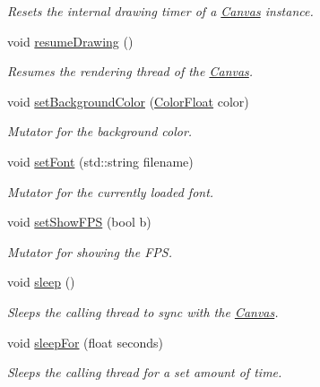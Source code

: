\begin{DoxyCompactItemize}
\begin{DoxyCompactList}\small\item\em Resets the internal drawing timer of a \hyperlink{classtsgl_1_1_canvas}{Canvas} instance. \end{DoxyCompactList}\item 
void \hyperlink{classtsgl_1_1_canvas_a56bf3c6e4eb7b06015d1c115aaa143f8}{resume\+Drawing} ()
\begin{DoxyCompactList}\small\item\em Resumes the rendering thread of the \hyperlink{classtsgl_1_1_canvas}{Canvas}. \end{DoxyCompactList}\item 
void \hyperlink{classtsgl_1_1_canvas_abb668fe42e2fe7f269b255152df959d8}{set\+Background\+Color} (\hyperlink{structtsgl_1_1_color_float}{Color\+Float} color)
\begin{DoxyCompactList}\small\item\em Mutator for the background color. \end{DoxyCompactList}\item 
void \hyperlink{classtsgl_1_1_canvas_a692edf8e37c7714cdf2a58ea530c63e9}{set\+Font} (std\+::string filename)
\begin{DoxyCompactList}\small\item\em Mutator for the currently loaded font. \end{DoxyCompactList}\item 
void \hyperlink{classtsgl_1_1_canvas_a8722c579dfa55a45e139bfeb269d73ff}{set\+Show\+F\+P\+S} (bool b)
\begin{DoxyCompactList}\small\item\em Mutator for showing the F\+P\+S. \end{DoxyCompactList}\item 
void \hyperlink{classtsgl_1_1_canvas_a2604fa056d4541f918ccf447eda1f3cf}{sleep} ()
\begin{DoxyCompactList}\small\item\em Sleeps the calling thread to sync with the \hyperlink{classtsgl_1_1_canvas}{Canvas}. \end{DoxyCompactList}\item 
void \hyperlink{classtsgl_1_1_canvas_a6674cc86b9a54b6a564021fddce47e36}{sleep\+For} (float seconds)
\begin{DoxyCompactList}\small\item\em Sleeps the calling thread for a set amount of time. \end{DoxyCompactList}\item 

\end{DoxyCompactItemize}
